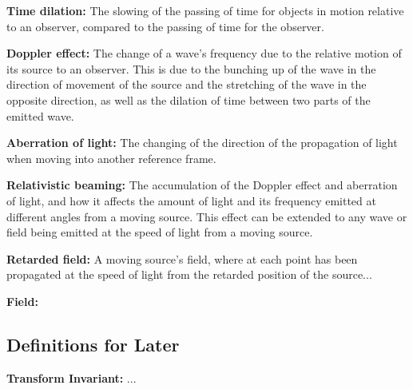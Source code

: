 \noindent \hypertarget{def-time-dilation}{\textbf{Time dilation:}}
The slowing of the passing of time for objects in motion relative to an observer, compared to the passing of time for the observer.

\noindent \hypertarget{def-doppler-effect}{\textbf{Doppler effect:}}
The change of a wave's frequency due to the relative motion of its source to an observer. This is due to the bunching up of the wave in the direction of movement of the source and the stretching of the wave in the opposite direction, as well as the dilation of time between two parts of the emitted wave.

\noindent \hypertarget{def-aberration}{\textbf{Aberration of light:}}
The changing of the direction of the propagation of light when moving into another reference frame.

\noindent \hypertarget{def-relativistic-beaming}{\textbf{Relativistic beaming:}}
The accumulation of the Doppler effect and aberration of light, and how it affects the amount of light and its frequency emitted at different angles from a moving source. This effect can be extended to any wave or field being emitted at the speed of light from a moving source.

\noindent \hypertarget{def-retarded-field}{\textbf{Retarded field:}}
A moving source's field, where at each point has been propagated at the speed of light from the retarded position of the source...

\noindent \hypertarget{def-field}{\textbf{Field:}}


\subsection{Definitions for Later}%

\noindent \hypertarget{def-lorentz-invariant}{\textbf{Transform Invariant:}}
...

